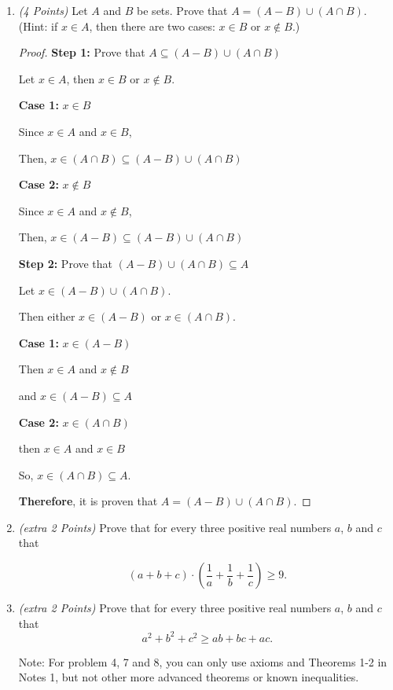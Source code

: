 \documentclass[10pt]{article} %
\newcommand{\points}[1]{{\it (#1 Points)}}
\begin{document}
\begin{enumerate}
\begin{proof} {\bf Step 1:}
{\bf Therefore}, $(A - B) \cup (A - C) = A - (B \cap C)$.  

\end{proof}


\item \points{4} Let $A$ and $B$ be sets. Prove that $A=(A-B)\cup (A \cap B)$. (Hint: if $x\in A$, then there are two cases: $x\in B$ or $x\not\in B$.)

\bigskip


\begin{proof} {\bf Step 1:} Prove that $A \subseteq (A - B) \cup (A \cap B)$

Let $x \in A$, then $x \in B$ or $x \not\in B$.  
\begin{center} {\bf Case 1:} $x \in B$ 

Since $x \in A$ and $x \in B$, 

Then, $x \in (A \cap B) \subseteq (A - B) \cup (A \cap B)$
\end{center}
\begin{center} {\bf Case 2:} $x \not\in B$

Since $x \in A$ and $x \not\in B$,

Then, $x \in (A - B) \subseteq (A - B) \cup (A \cap B)$
\end{center}

{\bf Step 2:} Prove that $(A - B) \cup (A \cap B) \subseteq A$

Let $x \in (A - B) \cup (A \cap B)$.  

Then either $x \in (A - B)$ or $x \in (A \cap B)$.  
\begin{center}
{\bf Case 1:} $x \in (A - B)$

Then $x \in A$ and $x \not\in B$

and $x \in (A - B) \subseteq A$
\end{center}
\begin{center}
{\bf Case 2:} $x \in (A \cap B)$

then $x \in A$ and $x \in B$

So, $x \in (A \cap B) \subseteq A$.  
\end{center}

{\bf Therefore}, it is proven that $A = (A - B) \cup (A \cap B)$.  

\end{proof}

\item \points{extra 2} Prove that for every three positive real numbers $a$, $b$ and $c$ that

$$\left(a+b+c\right)\cdot \left(\frac{1}{a}+\frac{1}{b}+\frac{1}{c}\right)\ge 9.$$

\item \points{extra 2} Prove that for every three positive real numbers $a$, $b$ and $c$ that
    $$a^2+b^2+c^2\ge ab+bc+ac.$$
    
Note: For problem 4, 7 and 8, you can only use axioms and Theorems 1-2 in Notes 1, but not other more advanced theorems or known inequalities.

\end{enumerate}
\end{document}
